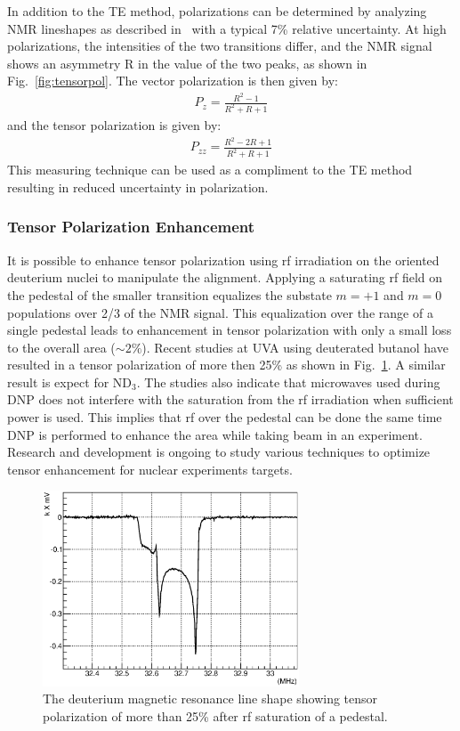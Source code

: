 In addition to the TE method, polarizations can be determined by analyzing NMR lineshapes as described in~\cite{Dulya:1997qc} with a typical  7\% relative uncertainty.  At high polarizations, the
intensities of the two transitions differ, and the NMR signal shows an asymmetry R in the
value of the two peaks, as shown in Fig.~\ref{fig:tensorpol}.  The vector polarization is then given by:
\begin{eqnarray}
\label{RVECT}
P_{z} = \frac{R^2-1}{R^2+R+1}
\end{eqnarray}
and the tensor polarization is given by:
\begin{eqnarray}
\label{TVECT}P_{zz} = \frac{R^2-2 R +1}{R^2+R+1}
\end{eqnarray}
This measuring technique can be used as a compliment to the TE method resulting in reduced uncertainty in polarization.


\subsubsection{Tensor Polarization Enhancement}
It is possible to enhance tensor polarization using rf irradiation on the oriented deuterium nuclei to manipulate the alignment.
Applying a saturating rf field on the pedestal of the smaller transition equalizes the substate $m=+1$ and $m=0$ populations
over 2/3 of the NMR signal.  This equalization over the range of a single pedestal leads to enhancement in tensor polarization with only a small loss
to the overall area ($\sim 2\%$).  Recent studies at UVA using deuterated butanol have resulted in a tensor polarization of more then
25\% as shown in Fig.~\ref{fig:study}.  A similar result is expect for ND$_3$.  The studies also indicate that microwaves used during DNP does not
interfere with the saturation from the rf irradiation when sufficient power is used.  This implies that rf over the pedestal can be done the same time DNP is performed to enhance the area while taking beam in an experiment.  Research and development is ongoing to study various
techniques to optimize tensor enhancement for nuclear experiments targets.
\begin{figure}
\centering
\includegraphics[width=3.0in,clip]{figs/study.eps}
\caption{The deuterium magnetic resonance line shape showing tensor polarization of more than 25\% after rf saturation of a pedestal.}  
\label{fig:study}
\end{figure}

